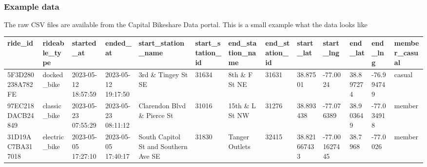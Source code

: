 \documentclass[aspectratio=169]{beamer}
\begin{document}
\begin{frame}
    \frametitle{Example data}
    The raw CSV files are available from the Capital Bikeshare Data portal. This is a small example what the data looks like
    \begin{table}[]
        \begin{tabular}{lllllllllllll}
            \hline
            \multicolumn{1}{|l|}{ride\_id} & \multicolumn{1}{l|}{rideable\_type} & \multicolumn{1}{l|}{started\_at} & \multicolumn{1}{l|}{ended\_at} & \multicolumn{1}{l|}{start\_station\_name} & \multicolumn{1}{l|}{start\_station\_id} & \multicolumn{1}{l|}{end\_station\_name} & \multicolumn{1}{l|}{end\_station\_id} & \multicolumn{1}{l|}{start\_lat} & \multicolumn{1}{l|}{start\_lng} & \multicolumn{1}{l|}{end\_lat} & \multicolumn{1}{l|}{end\_lng} & \multicolumn{1}{l|}{member\_casual} \\ \hline
            5F3D280238A782FE               & docked\_bike                        & 2023-05-12 18:57:59              & 2023-05-12 19:17:50            & 3rd \& Tingey St SE                       & 31634                                   & 8th \& F St NE                          & 31631                                 & 38.87501                        & -77.0024                        & 38.897274                     & -76.994749                    & casual                              \\
            97EC218DACB24849               & classic\_bike                       & 2023-05-23 07:55:29              & 2023-05-23 08:11:12            & Clarendon Blvd \& Pierce St               & 31016                                   & 15th \& L St NW                         & 31276                                 & 38.893438                       & -77.076389                      & 38.903649                     & -77.034918                    & member                              \\
            31D19AC7BA317018               & electric\_bike                      & 2023-05-05 17:27:10              & 2023-05-05 17:40:17            & South Capitol St and Southern Ave SE      & 31830                                   & Tanger Outlets                          & 32415                                 & 38.821667433                    & -77.001627445                   & 38.7968                       & -77.0026                      & member
        \end{tabular}
    \end{table}
\end{frame}
\end{document}
